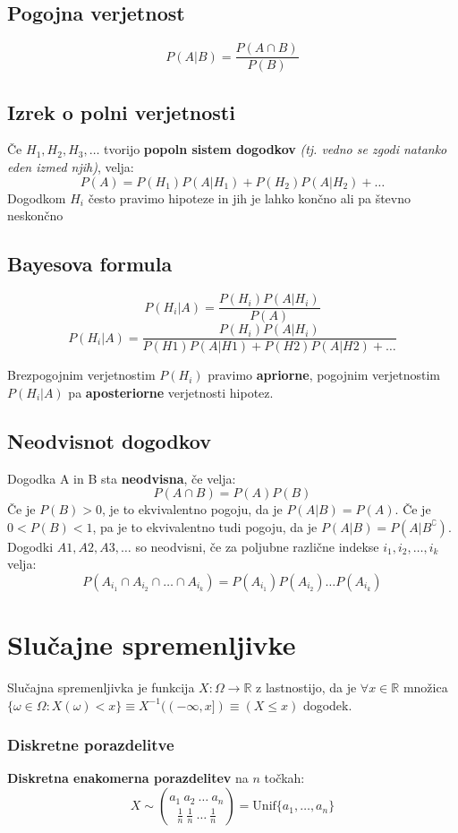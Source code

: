 \begin{multicols}{5}
\subsection{Pogojna verjetnost}
\[ P(A | B) = \frac{P(A \cap B)}{P(B)}\]


\subsection{Izrek o polni verjetnosti}
Če $H_1, H_2, H_3, \dots $ tvorijo \textbf{popoln sistem dogodkov} \textit{(tj. vedno se zgodi natanko eden izmed njih)}, velja:
\[ P(A) = P(H_1) P(A | H_1) + P(H_2) P(A | H_2) + \dots \]
Dogodkom $H_i$ često pravimo hipoteze in jih je lahko končno ali pa števno
neskončno

\subsection{Bayesova formula}
\[ P(H_i | A) = \frac{P(H_i)P(A | H_i)}{P(A)}\]
\[ P(H_i | A) = \frac{P(H_i) P(A | H_i)}{P(H1) P(A | H1) + P(H2) P(A | H2) + \dots } \]

Brezpogojnim verjetnostim $P(H_i)$ pravimo \textbf{apriorne}, pogojnim verjetnostim
$P(H_i | A)$ pa \textbf{aposteriorne} verjetnosti hipotez.

\subsection{Neodvisnot dogodkov}

Dogodka A in B sta \textbf{neodvisna}, če velja:
\[ P(A \cap B) = P(A) P(B) \]
Če je $P(B) > 0$, je to ekvivalentno pogoju, da je $P(A | B) = P(A)$.
Če je $0 < P(B) < 1$, pa je to ekvivalentno tudi pogoju, da je $P(A | B) = P(A | B^\complement)$.
Dogodki $A1, A2, A3, \dots$ so neodvisni, če za poljubne različne indekse $i_1, i_2, \dots , i_k$ velja:
\[ P(A_{i_1} \cap A_{i_2} \cap \dots \cap A_{i_k}) = P(A_{i_1}) P(A_{i_2}) \dots P(A_{i_k}) \]

\section{Slučajne spremenljivke}
Slučajna spremenljivka je funkcija $X: \Omega \to \mathbb{R}$ z lastnostijo, da je $\forall x \in \mathbb{R}$ množica $\{ \omega \in \Omega : X(\omega) < x \} \equiv X^{-1}((-\infty, x]) \equiv (X \leq x)$ dogodek.

\subsubsection{Diskretne porazdelitve}
\textbf{Diskretna enakomerna porazdelitev} na $n$ točkah:
\[ X \sim \binom{a_1\ a_2\ \dots\ a_n}{\frac{1}{n}\ \frac{1}{n}\ \dots\ \frac{1}{n}} = \text{Unif} \{ a_1 , \dots , a_n \} \]


\end{multicols}

